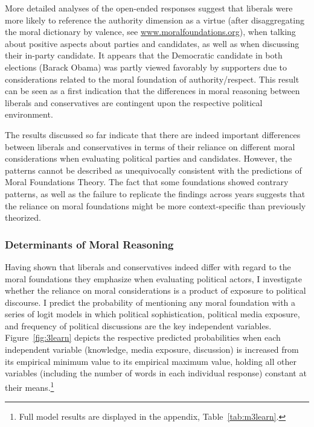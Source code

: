 \documentclass[12pt]{article}
\begin{document}
More detailed analyses of the open-ended responses suggest that liberals were more likely to reference the authority dimension as a virtue (after disaggregating the moral dictionary by valence, see \url{www.moralfoundations.org}), when talking about positive aspects about parties and candidates, as well as when discussing their in-party candidate. It appears that the Democratic candidate in both elections (Barack Obama) was partly viewed favorably by supporters due to considerations related to the moral foundation of authority/respect. This result can be seen as a first indication that the differences in moral reasoning between liberals and conservatives are contingent upon the respective political environment.

The results discussed so far indicate that there are indeed important differences between liberals and conservatives in terms of their reliance on different moral considerations when evaluating political parties and candidates. However, the patterns cannot be described as unequivocally consistent with the predictions of Moral Foundations Theory. The fact that some foundations showed contrary patterns, as well as the failure to replicate the findings across years suggests that the reliance on moral foundations might be more context-specific than previously theorized.


\subsubsection{Determinants of Moral Reasoning}

Having shown that liberals and conservatives indeed differ with regard to the moral foundations they emphasize when evaluating political actors, I investigate whether the reliance on moral considerations is a product of exposure to political discourse. I predict the probability of mentioning any moral foundation with a series of logit models in which political sophistication, political media exposure, and frequency of political discussions are the key independent variables. Figure~\ref{fig:3learn} depicts the respective predicted probabilities when each independent variable (knowledge, media exposure, discussion) is increased from its empirical minimum value to its empirical maximum value, holding all other variables (including the number of words in each individual response) constant at their means.\footnote{Full model results are displayed in the appendix, Table~\ref{tab:m3learn}.}
\end{document}
